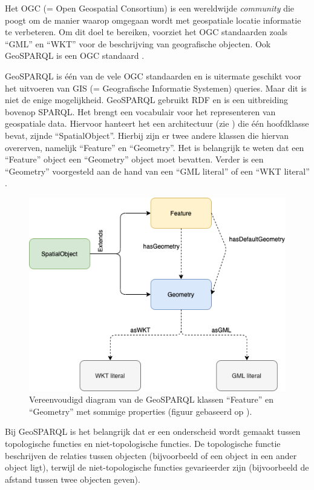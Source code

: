 \documentclass[twocolumn]{phdsymp} %
\begin{document}
Het OGC (= Open Geospatial Consortium) is een wereldwijde \textit{community} die poogt om de manier waarop omgegaan wordt met geospatiale locatie informatie te verbeteren. Om dit doel te bereiken, voorziet het OGC standaarden zoals ``GML'' en ``WKT'' voor de beschrijving van geografische objecten. Ook GeoSPARQL is een OGC standaard \cite{ogcdocs}.

GeoSPARQL is één van de vele OGC standaarden en is uitermate geschikt voor het uitvoeren van GIS (= Geografische Informatie Systemen) queries. Maar dit is niet de enige mogelijkheid. GeoSPARQL gebruikt RDF en is een uitbreiding bovenop SPARQL. Het brengt een vocabulair voor het representeren van geospatiale data. Hiervoor hanteert het een architectuur (zie ) die één hoofdklasse bevat, zijnde ``SpatialObject''. Hierbij zijn er twee andere klassen die hiervan overerven, namelijk ``Feature'' en ``Geometry''. Het is belangrijk te weten dat een ``Feature'' object een ``Geometry'' object moet bevatten. Verder is een ``Geometry'' voorgesteld aan de hand van een ``GML literal'' of een ``WKT literal'' \cite{ogcdocs}.

\begin{figure}[ht]
    \centering
    \includegraphics[width=\linewidth]{images/geosparql_architecture.png}
    \caption{Vereenvoudigd diagram van de GeoSPARQL klassen ``Feature'' en ``Geometry'' met sommige properties (figuur gebaseerd op \protect\cite{geosparqlsupport}).}
    \label{fig:abstr_geosparql_architecture}
\end{figure}

Bij GeoSPARQL is het belangrijk dat er een onderscheid wordt gemaakt tussen topologische functies en niet-topologische functies. De topologische functie beschrijven de relaties tussen objecten (bijvoorbeeld of een object in een ander object ligt), terwijl de niet-topologische functies gevarieerder zijn (bijvoorbeeld de afstand tussen twee objecten geven). 
\end{document}
